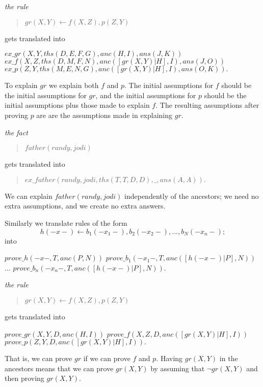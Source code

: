 \begin{example}\em
the rule
\begin{quote}
$gr(X,Y) \leftarrow f(X,Z), p(Z,Y)$
\end{quote}
gets translated into
\begin{prolog}
$ex\_gr(X,Y,ths(D,E,F,G),anc(H,I),ans(J,K))$\IF
$ex\_f(X,Z,ths(D,M,F,N),anc([gr(X,Y)|H],I),ans(J,O))$\AND
$ex\_p(Z,Y,ths(M,E,N,G),anc([gr(X,Y)|H],I),ans(O,K)).$
\end{prolog}
To explain $gr$ we explain both $f$ and $p$.
The initial assumptions for $f$ should be the initial assumptions for
$gr$, and the initial assumptions for $p$ should be the initial assumptions
plus those made to explain $f$. The resulting assumptions after proving $p$ are
are the assumptions made in explaining $gr$.
\end{example}

\begin{example} \em the fact
\begin{quote}
$father(randy,jodi)$
\end{quote}
gets translated into
\begin{quote}
$ex\_father(randy,jodi,ths(T,T,D,D),\_,ans(A,A)).$
\end{quote}
We can explain $father(randy,jodi)$ independently of the ancestors;
we need no extra assumptions, and we create no extra answers.
\end{example}

Similarly we translate rules of the form
\[h(-x-) \leftarrow b_1(-x_1-), b_2(-x_2-), ... ,b_N(-x_n-);\]
into
\begin{prolog}
$prove\_h(-x-, T, anc(P,N))$\IF
$prove\_b_1(-x_1-,T,anc([h(-x-)|P],N))$\AND
$...$\AND
$prove\_b_n(-x_n-,T,anc([h(-x-)|P],N)).$
\end{prolog}

\begin{example} \em the rule
\begin{quote}
$gr(X,Y) \leftarrow f(X,Z), p(Z,Y)$
\end{quote}
gets translated into
\begin{prolog}
$prove\_gr(X,Y,D,anc(H,I))$\IF
$prove\_f(X,Z,D,anc([gr(X,Y)|H],I))$\AND
$prove\_p(Z,Y,D,anc([gr(X,Y)|H],I)).$
\end{prolog}
That is, we can prove $gr$ if we can prove $f$ and $p$.
Having $gr(X,Y)$ in the ancestors means that we can prove $gr(X,Y)$
by assuming that $\neg gr(X,Y)$ and then proving $gr(X,Y)$.
\end{example}

